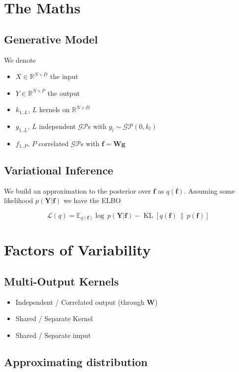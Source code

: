 \documentclass[12pt]{article}
\newcommand{\RR}{\mathbb{R}}
\newcommand{\EE}{\mathbb{E}}
\newcommand*{\KL}[2]{\ensuremath{\operatorname{KL}[#1 \,\|\, #2]}}
\newcommand{\vf}{\mathbf{f}}
\newcommand{\vg}{\mathbf{g}}
\newcommand{\vW}{\mathbf{W}}
\newcommand{\vY}{\mathbf{Y}}
\newcommand{\GP}{\mathcal{GP}}
\begin{document}
\maketitle

\section{The Maths}
\subsection{Generative Model}

We denote 
\begin{itemize}
\item $X \in \RR^{N \times D}$ the input
\item $Y \in \RR^{N \times P}$ the output
\item $k_{1..L}$, $L$ kernels on $\RR^{N \times D}$
\item $g_{1..L}$, $L$ independent $\GP$s  with $g_l \sim \GP(0,k_l)$
\item $f_{1..P}$, $P$ correlated  $\GP$s  with $\vf = \vW \vg$ 
\end{itemize}


\subsection{Variational Inference}

We build an approximation to the posterior over $\vf$ as $q(\vf)$.
Assuming some likelihood $p(\vY|\vf)$ we have the ELBO

\[
	\mathcal{L}(q) = \EE_{q(\vf)}\log\,p(\vY|\vf) - \KL{q(\vf)}{p(\vf)}
\]


\section{Factors of Variability}

\subsection{Multi-Output Kernels}
\begin{itemize}
\item Independent / Correlated output (through $\vW$)
\item Shared / Separate Kernel
\item Shared / Separate imput
\end{itemize}


\subsection{Approximating distribution}
\end{document}
